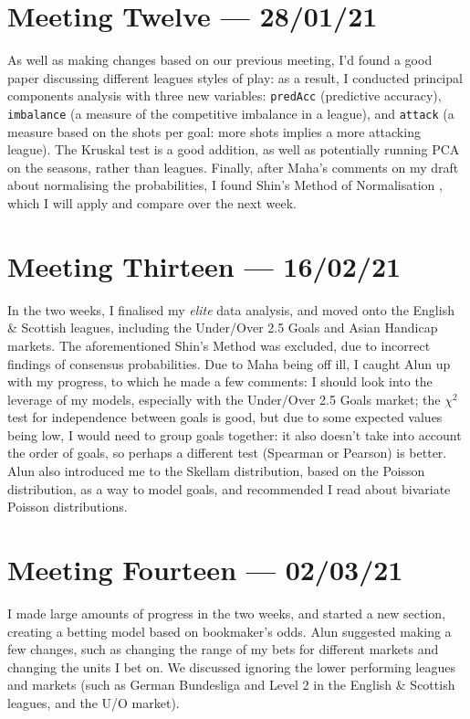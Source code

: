 \documentclass[a4paper,10pt]{report}
\begin{document}
\section*{Meeting Twelve --- 28/01/21} %
As well as making changes based on our previous meeting, I'd found a good paper discussing different leagues styles of play: as a result, I conducted principal components analysis with three new variables: \lstinline|predAcc| (predictive accuracy), \lstinline|imbalance| (a measure of the competitive imbalance in a league), and \lstinline|attack| (a measure based on the shots per goal: more shots implies a more attacking league). The Kruskal test is a good addition, as well as potentially running PCA on the seasons, rather than leagues. Finally, after Maha's comments on my draft about normalising the probabilities, I found Shin's Method of Normalisation \autocite{Strumbelj14}, which I will apply and compare over the next week.

\section*{Meeting Thirteen --- 16/02/21} %
In the two weeks, I finalised my \textit{elite} data analysis, and moved onto the English \& Scottish leagues, including the Under/Over 2.5 Goals and Asian Handicap markets. The aforementioned Shin's Method was excluded, due to incorrect findings of consensus probabilities. Due to Maha being off ill, I caught Alun up with my progress, to which he made a few comments: I should look into the leverage of my models, especially with the Under/Over 2.5 Goals market; the $\chi^2$ test for independence between goals is good, but due to some expected values being low, I would need to group goals together: it also doesn't take into account the order of goals, so perhaps a different test (Spearman or Pearson) is better. Alun also introduced me to the Skellam distribution, based on the Poisson distribution, as a way to model goals, and recommended I read about bivariate Poisson distributions.

\section*{Meeting Fourteen --- 02/03/21} 
I made large amounts of progress in the two weeks, and started a new section, creating a betting model based on bookmaker's odds. Alun suggested making a few changes, such as changing the range of my bets for different markets and changing the units I bet on. We discussed ignoring the lower performing leagues and markets (such as German Bundesliga and Level 2 in the English \& Scottish leagues, and the U/O market). 
\end{document}
